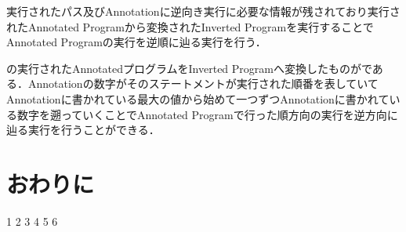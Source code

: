 \documentclass[submit,PRO]{ipsj}
\begin{document}
実行されたパス及びAnnotationに逆向き実行に必要な情報が残されており実行されたAnnotated Programから変換されたInverted Programを実行することでAnnotated Programの実行を逆順に辿る実行を行う．


の実行されたAnnotatedプログラムをInverted Programへ変換したものがである．Annotationの数字がそのステートメントが実行された順番を表していてAnnotationに書かれている最大の値から始めて一つずつAnnotationに書かれている数字を遡っていくことでAnnotated Programで行った順方向の実行を逆方向に辿る実行を行うことができる．


\section{おわりに}


\begin{thebibliography}{10}
 1
 2
 3
 4
 5
 6
\end{thebibliography}
\end{document}
